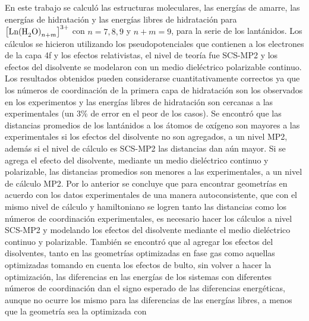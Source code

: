 En este trabajo se calcul\'o las estructuras moleculares, las 
energ\'ias de amarre, las energ\'ias de hidrataci\'on y las
energ\'ias libres de hidrataci\'on para $\left[\mbox{Ln(H}_2\mbox{O)}_{{n+m}}\right]^{3+}$ con $n=7, 8, 9$ y
$n+m=9$, para la serie de los lant\'anidos. Los c\'alculos se 
hicieron utilizando los pseudopotenciales que contienen a los 
electrones de la capa 4f y los efectos relativistas, el nivel de 
teor\'ia fue SCS-MP2 y los efectos del disolvente se modelaron con un
medio diel\'ectrico polarizable continuo. Los resultados obtenidos 
pueden considerarse cuantitativamente correctos ya que los n\'umeros 
de coordinaci\'on de la primera capa de hidrataci\'on son los 
observados en los experimentos y las energ\'ias libres de 
hidrataci\'on son cercanas a las experimentales (un 3\% de error en 
el peor de los casos). Se encontr\'o que las distancias promedios de
los lant\'anidos a los \'atomos de ox\'igeno son mayores a las 
experimentales si los efectos del disolvente no son agregados, a un 
nivel MP2, adem\'as si el nivel de c\'alculo es SCS-MP2 las 
distancias dan a\'un mayor. Si se agrega el efecto del disolvente, 
mediante un medio diel\'ectrico continuo y polarizable, las 
distancias promedios son menores a las experimentales, a un nivel de 
c\'alculo MP2. Por lo anterior se concluye que para encontrar 
geometr\'ias en acuerdo con los datos experimentales de una manera 
autoconsistente, que con el mismo nivel de c\'alculo y hamiltoniano 
se logren tanto las distancias como los n\'umeros de coordinaci\'on 
experimentales, es necesario hacer los c\'alculos a nivel SCS-MP2 y
modelando los efectos del disolvente mediante el medio diel\'ectrico
continuo y polarizable. Tambi\'en se encontr\'o que al agregar los
efectos del disolventes, tanto en las geometr\'ias optimizadas en 
fase gas como aquellas optimizadas tomando en cuenta los efectos de
bulto, sin volver a hacer la optimizaci\'on, las diferencias en las 
energ\'ias de los sistemas con diferentes n\'umeros de coordinaci\'on
dan el signo esperado de las diferencias energ\'eticas, aunque no 
ocurre los mismo para las diferencias de las energ\'ias libres, a 
menos que la geometr\'ia sea la optimizada con

